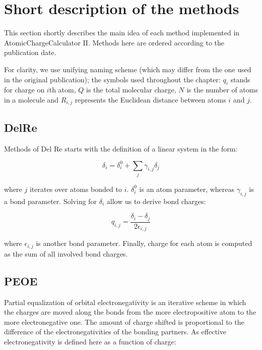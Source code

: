 \documentclass[oneside]{memoir}
\newcommand\ddfrac[2]{\frac{\displaystyle #1}{\displaystyle #2}}
\begin{document}
\chapter*{Short description of the methods}
This section shortly describes the main idea of each method implemented in AtomicChargeCalculator II. Methods here are ordered according to the publication date.

For clarity, we use unifying naming scheme (which may differ from the one used in the original publication); the symbols used throughout the chapter: $q_i$ stands for charge on $i$th atom, $Q$ is the total molecular charge, $N$ is the number of atoms in a molecule and $R_{i, j}$ represents the Euclidean distance between atoms $i$ and $j$.

\section*{DelRe}
\label{sec:methods_delre}
Methods of Del Re \cite{DelRe1958} starts with the definition of a linear system in the form:

\begin{equation}
\label{eq:delre_main}
\delta_i = \delta_i^0 + \sum_{j}\gamma_{i, j}\delta_j
\end{equation}

where $j$ iterates over atoms bonded to $i$. $\delta_i^0$ is an atom parameter, whereas $\gamma_{i, j}$ is a bond parameter. Solving for $\delta_i$ allow us to derive bond charges:

\begin{equation}
\label{eq:delre_bond}
q_{i, j} = \ddfrac{\delta_i - \delta_j}{2\epsilon_{i, j}}
\end{equation}

where $\epsilon_{i, j}$ is another bond parameter. Finally, charge for each atom is computed as the sum of all involved bond charges. 

\section*{PEOE}
\label{sec:methods_peoe}

Partial equalization of orbital electronegativity \cite{Gasteiger1978, Gasteiger1980} is an iterative scheme in which the charges are moved along the bonds from the more electropositive atom to the more electronegative one. The amount of charge shifted is proportional to the difference of the electronegativities of the bonding partners. As effective electronegativity is defined here as a function of charge:
\end{document}
